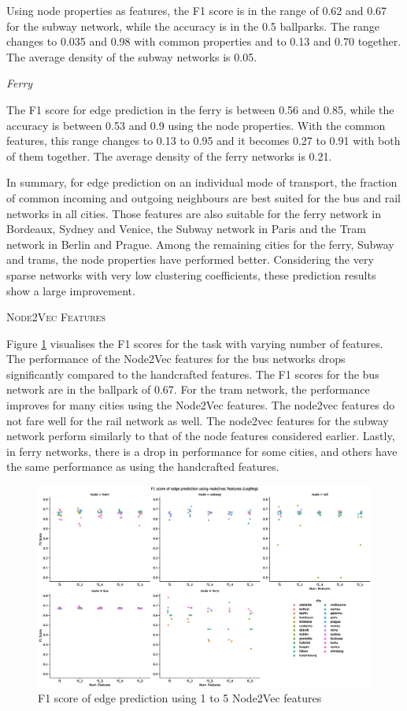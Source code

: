 \documentclass{article}
\theoremstyle{plain}
\theoremstyle{definition}
\theoremstyle{remark}
\begin{document}
Using node properties as features, the F1 score is in the range of 0.62 and 0.67 for the subway network, while the accuracy is in the 0.5 ballparks. The range changes to 0.035 and 0.98 with common properties and to 0.13 and 0.70 together. The average density of the subway networks is 0.05.

\textit{Ferry}

The F1 score for edge prediction in the ferry is between 0.56 and 0.85, while the accuracy is between 0.53 and 0.9 using the node properties. With the common features, this range changes to 0.13 to 0.95 and it becomes 0.27 to 0.91 with both of them together. The average density of the ferry networks is 0.21. 

In summary, for edge prediction on an individual mode of transport, the fraction of common incoming and outgoing neighbours are best suited for the bus and rail networks in all cities. Those features are also suitable for the ferry network in Bordeaux, Sydney and Venice, the Subway network in Paris and the Tram network in Berlin and Prague. Among the remaining cities for the ferry, Subway and trams, the node properties have performed better. Considering the very sparse networks with very low clustering coefficients, these prediction results show a large improvement.

\textsc{Node2Vec Features}

Figure \ref{edge-pred-n2v_fig} visualises the F1 scores for the task with varying number of features. The performance of the Node2Vec features for the bus networks drops significantly compared to the handcrafted features. The F1 scores for the bus network are in the ballpark of 0.67. For the tram network, the performance improves for many cities using the Node2Vec features. The node2vec features do not fare well for the rail network as well. The node2vec features for the subway network perform similarly to that of the node features considered earlier. Lastly, in ferry networks, there is a drop in performance for some cities, and others have the same performance as using the handcrafted features.

\begin{figure}[ht]
\vskip -0.1in
\begin{center}
\centerline{\includegraphics[width=\columnwidth]{images/edge-pred-node2vec.eps}}
\caption{F1 score of edge prediction using 1 to 5 Node2Vec features}
\label{edge-pred-n2v_fig}
\end{center}
\vskip -0.3in
\end{figure}
\end{document}

